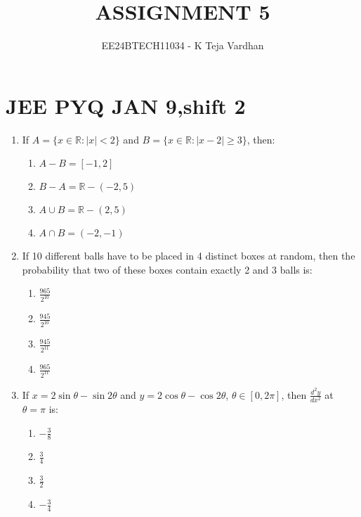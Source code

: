 \documentclass[journal]{IEEEtran}
\numberwithin{equation}{enumi}
\numberwithin{figure}{enumi}
\begin{document}

\title{ASSIGNMENT 5}
\author{EE24BTECH11034 - K Teja Vardhan}
{\let\newpage\relax\maketitle}

\section{JEE PYQ JAN 9,shift 2}
\begin{enumerate}

    \item If \( A = \{x \in \mathbb{R} : |x| < 2\} \) and \( B = \{x \in \mathbb{R} : |x - 2| \geq 3\} \), then:
        \begin{multicols}{4}
        \begin{enumerate}
            \item \( A - B = [-1, 2] \)  
            \item \( B - A = \mathbb{R} - (-2, 5) \)  
            \item \( A \cup B = \mathbb{R} - (2, 5) \)  
            \item \( A \cap B = (-2, -1) \)
        \end{enumerate}
        \end{multicols}

    \item If 10 different balls have to be placed in 4 distinct boxes at random, then the probability that two of these boxes contain exactly 2 and 3 balls is:
        \begin{multicols}{4}
        \begin{enumerate}
            \item \( \frac{965}{2^{10}} \)  
            \item \( \frac{945}{2^{10}} \)  
            \item \( \frac{945}{2^{11}} \)  
            \item \( \frac{965}{2^{11}} \)
        \end{enumerate}
        \end{multicols}

    \item If \( x = 2 \sin \theta - \sin 2 \theta \) and \( y = 2 \cos \theta - \cos 2 \theta \), \( \theta \in [0, 2\pi] \), then \( \frac{d^2y}{dx^2} \) at \( \theta = \pi \) is:
        \begin{multicols}{4}
        \begin{enumerate}
            \item \( -\frac{3}{8} \)  
            \item \( \frac{3}{4} \)  
            \item \( \frac{3}{2} \)  
            \item \( -\frac{3}{4} \)
        \end{enumerate}
        \end{multicols}


\end{enumerate}
\end{document}
